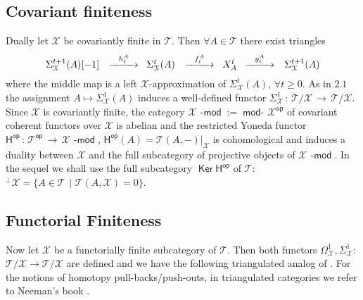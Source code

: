 \documentclass[oneside, a4paper,reqno]{amsart}
\numberwithin{equation}{section}
\theoremstyle{definition}
\begin{document}
 \subsection{Covariant finiteness} Dually let ${\mathcal X}$ be covariantly finite in ${\mathcal T}$. Then  $\forall A \in {\mathcal T}$ there exist triangles 
\begin{equation}
\begin{CD}
\Sigma^{t+1}_{\mathcal X}(A)[-1] \,\ @> h^{A}_{t} >> \,\, \Sigma^{t}_{\mathcal X}(A) \,\ @> f^{A}_{t} >>  \,\, X^{t}_{A} \,\, @> g^{A}_{t} >>  \,\ \Sigma^{t+1}_{\mathcal X}(A)
\end{CD}
\end{equation}
where the middle map is a left ${\mathcal X}$-approximation of $\Sigma^{t}_{\mathcal X}(A)$, $\forall t \geq 0$. As in $2.1$ the assignment $A \longmapsto \Sigma^{1}_{\mathcal X}(A)$ induces a well-defined functor $\Sigma^{1}_{\mathcal X} \, \colon \, {\mathcal T}/{\mathcal X} \, {\longrightarrow} \, {\mathcal T}/{\mathcal X}$.  Since ${\mathcal X}$ is covariantly finite, the category ${\mathcal X}\operatorname*{\!-\mathsf{mod}} := \operatorname*{\mathsf{mod}-\!}{\mathcal X}^\operatorname*{\mathsf{op}}$ of covariant coherent functors over ${\mathcal X}$ is abelian and the restricted Yoneda functor  $
\mathsf{H}^\operatorname*{\mathsf{op}} \, \colon \, {\mathcal T}^\operatorname*{\mathsf{op}} \, {\longrightarrow} \, {\mathcal X}\operatorname*{\!-\mathsf{mod}}$, $\mathsf{H}^\operatorname*{\mathsf{op}}(A) = {\mathcal T}(A,-)|_{\mathcal X} 
$
is cohomological and induces a duality between ${\mathcal X}$ and the full subcategory of projective objects of ${\mathcal X}\operatorname*{\!-\mathsf{mod}}$. In the sequel we shall use  the full subcategory $\operatorname*{\mathsf{Ker}} \mathsf{H}^\operatorname*{\mathsf{op}}$ of ${\mathcal T}$: \,\! ${^{\bot}}{\mathcal X} = \{A \in {\mathcal T} \,\ | \,\, {\mathcal T}(A,{\mathcal X}) = 0\}$. 

\subsection{Functorial Finiteness} Now let ${\mathcal X}$ be  a functorially finite subcategory of ${\mathcal T}$. Then both functors $\Omega^{1}_{\mathcal X}, \Sigma^{1}_{\mathcal X} \colon$ ${\mathcal T}/{\mathcal X} {\longrightarrow} {\mathcal T}/{\mathcal X}$ are defined and we have the following triangulated analog of \cite[Proposition 2.5]{B:gor}. For the notions of homotopy pull-backs/push-outs, in triangulated categories we refer to Neeman's book \cite[Chapter 1]{Neeman}.  
\end{document}
